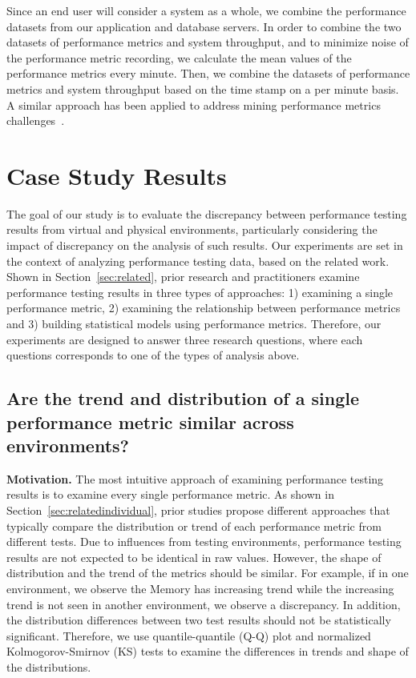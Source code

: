 \documentclass[smallextended]{svjour3}       %
\begin{document}
Since an end user will consider a system as a whole, we combine the performance datasets from our application and database servers. In order to combine the two datasets of performance metrics and system throughput, and to minimize noise of the performance metric recording, we calculate the mean values of the performance metrics every minute. Then, we combine the datasets of performance metrics and system throughput based on the time stamp on a per minute basis. A similar approach has been applied to address mining performance metrics challenges~\cite{foo2010mining}.



\section{Case Study Results}
\label{sec:results}

The goal of our study is to evaluate the discrepancy between performance testing results from virtual and physical environments, particularly considering the impact of discrepancy on the analysis of such results. Our experiments are set in the context of analyzing performance testing data, based on the related work. Shown in Section~\ref{sec:related}, prior research and practitioners examine performance testing results in three types of approaches: 1) examining a single performance metric, 2) examining the relationship between performance metrics and 3) building statistical models using performance metrics. Therefore, our experiments are designed to answer three research questions, where each questions corresponds to one of the types of analysis above.



\subsection{Are the trend and distribution of a single performance metric similar across environments?}
\label{sec:individual}


\noindent \textbf{Motivation.}
The most intuitive approach of examining performance testing results is to examine every single performance metric. As shown in Section~\ref{sec:relatedindividual}, prior studies propose different approaches that typically compare the distribution or trend of each performance metric from different tests. Due to influences from testing environments, performance testing results are not expected to be identical in raw values. However, the shape of distribution and the trend of the metrics should be similar. For example, if in one environment, we observe the Memory has increasing trend while the increasing trend is not seen in another environment, we observe a discrepancy. In addition, the distribution differences between two test results should not be statistically significant. Therefore, we use quantile-quantile (Q-Q) plot and normalized Kolmogorov-Smirnov (KS) tests to examine the differences in trends and shape of the distributions. 
\end{document}
